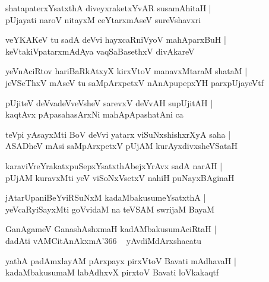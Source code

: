 \documentclass[twoside,12pt,openright]{book}
\newcounter{shloka}[chapter]
\begin{document}
\begin{shloka}%
shatapaterxYsatxthA diveyxraketxYvAR susamAhitaH |\\
pUjayati naroV nitayxM ceYtarxmAseV sureVshavxri 
\end{shloka}

\begin{shloka}%
veYKAKeV tu sadA deVvi hayxcaRniVyoV mahAparxBuH |\\
keVtakiVpatarxmAdAya vaqSaBasethxV divAkareV 
\end{shloka}

\begin{shloka}%
yeVnAciRtov hariBaRkAtxyX kirxVtoV manavxMtaraM shataM |\\
jeVSeThxV mAseV tu saMpArxpetxV nAnApupepxYH parxpUjayeVtf 
\end{shloka}

\begin{shloka}%
pUjiteV deVvadeVveVsheV sarevxV deVvAH supUjitAH |\\
kaqtAvx pApasahasArxNi mahApApashatAni ca 
\end{shloka}

\begin{shloka}%
teVpi yAsayxMti BoV deVvi yatarx viSuNxshishxrXyA saha |\\
ASADheV mAsi saMpArxpetxV pUjAM kurAyxdivxsheVSataH
\end{shloka}

\begin{shloka}%
karaviVreYrakatxpuSepxYsatxthAbejxYrAvx sadA narAH |\\
pUjAM kuravxMti yeV viSoNxVsetxV nahiH puNayxBAginaH 
\end{shloka}

\begin{shloka}%
jAtarUpaniBeYviRSuNxM kadaMbakusumeYsatxthA |\\
yeVcaRyiSayxMti goVvidaM na teVSAM swrijaM BayaM 
\end{shloka}

\begin{shloka}%
GanAgameV GanashAshxmaH kadAMbakusumAciRtaH |\\
dadAti vAMCitAnAkxmA\char'366 ~ yAvdiMdArxshacatu
\end{shloka}

\begin{shloka}%
yathA padAmxlayAM pArxpayx pirxVtoV Bavati mAdhavaH |\\
kadaMbakusumaM labAdhxvX pirxtoV Bavati loVkakaqtf 
\end{shloka}
\end{document}
